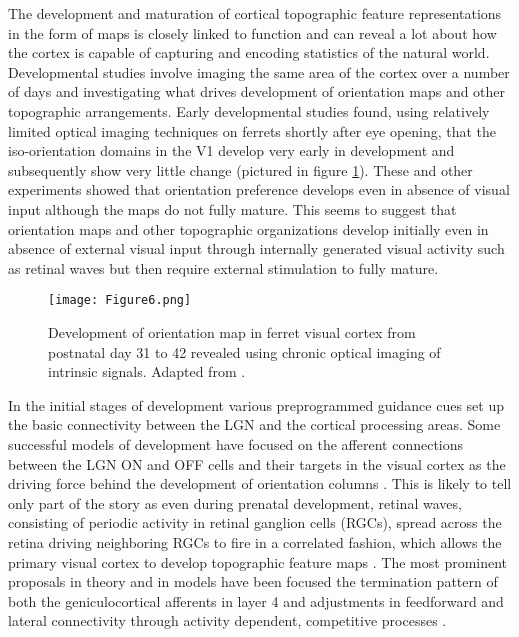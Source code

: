 The development and maturation of cortical topographic feature
representations in the form of maps is closely linked to function and
can reveal a lot about how the cortex is capable of capturing and
encoding statistics of the natural world. Developmental studies
involve imaging the same area of the cortex over a number of days and
investigating what drives development of orientation maps and other
topographic arrangements. Early developmental studies found, using
relatively limited optical imaging techniques on ferrets shortly after
eye opening, that the iso-orientation domains in the V1 develop very
early in development and subsequently show very little change
\citep{Chapman1996} (pictured in figure \ref{RFMapDevelopment}). These
and other experiments \citep{White2007} showed that orientation
preference develops even in absence of visual input although the maps
do not fully mature. This seems to suggest that orientation maps and
other topographic organizations develop initially even in absence of
external visual input through internally generated visual activity
such as retinal waves but then require external stimulation to fully
mature.

\begin{figure}
	\centering \texttt{[image: Figure6.png]}
	\caption{Development of orientation map in ferret visual
          cortex from postnatal day 31 to 42 revealed using chronic
          optical imaging of intrinsic signals. Adapted from
          \citep{Chapman1996}.}
	\label{RFMapDevelopment}
\end{figure}

In the initial stages of development various preprogrammed guidance
cues set up the basic connectivity between the LGN and the cortical
processing areas. Some successful models of development have focused
on the afferent connections between the LGN ON and OFF cells and their
targets in the visual cortex as the driving force behind the
development of orientation columns \citep{Jin2011}. This is likely to
tell only part of the story as even during prenatal development,
retinal waves, consisting of periodic activity in retinal ganglion
cells (RGCs), spread across the retina driving neighboring RGCs to
fire in a correlated fashion, which allows the primary visual cortex
to develop topographic feature maps \citep{Firth2005}. The most
prominent proposals in theory and in models have been focused the
termination pattern of both the geniculocortical afferents in layer 4
\citep{Katz2000,Ringach2007} and adjustments in feedforward and
lateral connectivity through activity dependent, competitive processes
\citep{Bednar2003}.

